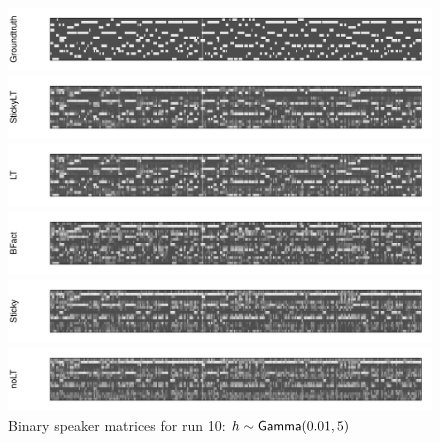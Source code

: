 \begin{figure}[tb]
\begin{center}
  \centerline{\includegraphics[width = \textwidth, height = 0.2\textwidth]{fig/cocktail/synth_s16_m12/hyper_h/h10.0_nocs_cp0/a0p01b5/groundtruth.pdf}}
  \centerline{\includegraphics[width = \textwidth, height = 0.2\textwidth]{fig/cocktail/synth_s16_m12/hyper_h/h10.0_nocs_cp0/a0p01b5/StickyLT_hdp_hmm_w0_ah0p01_bh5/binary_state.pdf}}
  \centerline{\includegraphics[width = \textwidth, height = 0.2\textwidth]{fig/cocktail/synth_s16_m12/hyper_h/h10.0_nocs_cp0/a0p01b5/LT_hdp_hmm_w0_ah0p01_bh5/binary_state.pdf}}
  \centerline{\includegraphics[width = \textwidth, height = 0.2\textwidth]{fig/cocktail/synth_s16_m12/hyper_h/h10.0_nocs_cp0/a0p01b5/BFact_hmm_w0_ah0p01_bh5/binary_state.pdf}}
  \centerline{\includegraphics[width = \textwidth, height = 0.2\textwidth]{fig/cocktail/synth_s16_m12/hyper_h/h10.0_nocs_cp0/a0p01b5/Sticky_hdp_hmm_w0_ah0p01_bh5/binary_state.pdf}}
  \centerline{\includegraphics[width = \textwidth, height = 0.2\textwidth]{fig/cocktail/synth_s16_m12/hyper_h/h10.0_nocs_cp0/a0p01b5/noLT_hdp_hmm_w0_ah0p01_bh5/binary_state.pdf}}
\caption{Binary speaker matrices for run 10: $h \sim \mathsf{Gamma}(0.01,5)$}
\end{center}
\end{figure}

